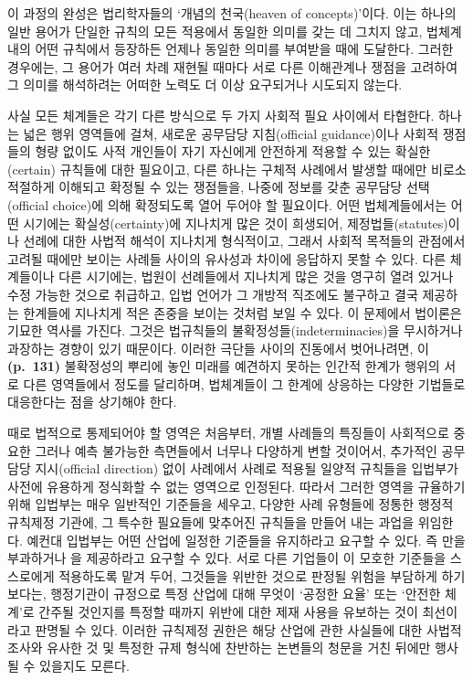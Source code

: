 이 과정의 완성은 법리학자들의 ‘개념의 천국(heaven of concepts)’이다.
이는 하나의 일반 용어가 단일한 규칙의 모든 적용에서 동일한 의미를 갖는
데 그치지 않고, 법체계 내의 어떤 규칙에서 등장하든 언제나 동일한 의미를
부여받을 때에 도달한다. 그러한 경우에는, 그 용어가 여러 차례 재현될
때마다 서로 다른 이해관계나 쟁점을 고려하여 그 의미를 해석하려는 어떠한
노력도 더 이상 요구되거나 시도되지 않는다.

사실 모든 체계들은 각기 다른 방식으로 두 가지 사회적 필요 사이에서
타협한다. 하나는 넓은 행위 영역들에 걸쳐, 새로운 공무담당 지침(official
guidance)이나 사회적 쟁점들의 형량 없이도 사적 개인들이 자기 자신에게
안전하게 적용할 수 있는 확실한(certain) 규칙들에 대한 필요이고, 다른
하나는 구체적 사례에서 발생할 때에만 비로소 적절하게 이해되고 확정될 수
있는 쟁점들을, 나중에 정보를 갖춘 공무담당 선택(official choice)에 의해
확정되도록 열어 두어야 할 필요이다. 어떤 법체계들에서는 어떤 시기에는
확실성(certainty)에 지나치게 많은 것이 희생되어, 제정법들(statutes)이나
선례에 대한 사법적 해석이 지나치게 형식적이고, 그래서 사회적 목적들의
관점에서 고려될 때에만 보이는 사례들 사이의 유사성과 차이에 응답하지
못할 수 있다. 다른 체계들이나 다른 시기에는, 법원이 선례들에서 지나치게
많은 것을 영구히 열려 있거나 수정 가능한 것으로 취급하고, 입법 언어가 그
개방적 직조에도 불구하고 결국 제공하는 한계들에 지나치게 적은 존중을
보이는 것처럼 보일 수 있다. 이 문제에서 법이론은 기묘한 역사를 가진다.
그것은 법규칙들의 불확정성들(indeterminacies)을 무시하거나 과장하는
경향이 있기 때문이다. 이러한 극단들 사이의 진동에서 벗어나려면, 이
\textbf{(p.~131)} 불확정성의 뿌리에 놓인 미래를 예견하지 못하는 인간적
한계가 행위의 서로 다른 영역들에서 정도를 달리하며, 법체계들이 그 한계에
상응하는 다양한 기법들로 대응한다는 점을 상기해야 한다.

때로 법적으로 통제되어야 할 영역은 처음부터, 개별 사례들의 특징들이
사회적으로 중요한 그러나 예측 불가능한 측면들에서 너무나 다양하게 변할
것이어서, 추가적인 공무담당 지시(official direction) 없이 사례에서
사례로 적용될 일양적 규칙들을 입법부가 사전에 유용하게 정식화할 수 없는
영역으로 인정된다. 따라서 그러한 영역을 규율하기 위해 입법부는 매우
일반적인 기준들을 세우고, 다양한 사례 유형들에 정통한 행정적 규칙제정
기관에, 그 특수한 필요들에 맞추어진 규칙들을 만들어 내는 과업을
위임한다. 예컨대 입법부는 어떤 산업에 일정한 기준들을 유지하라고 요구할
수 있다. 즉 만을 부과하거나 을 제공하라고 요구할 수 있다. 서로 다른
기업들이 이 모호한 기준들을 스스로에게 적용하도록 맡겨 두어,
 그것들을 위반한 것으로 판정될 위험을
부담하게 하기보다는, 행정기관이 규정으로 특정 산업에 대해 무엇이 ‘공정한
요율’ 또는 ‘안전한 체계’로 간주될 것인지를 특정할 때까지 위반에 대한
제재 사용을 유보하는 것이 최선이라고 판명될 수 있다. 이러한 규칙제정
권한은 해당 산업에 관한 사실들에 대한 사법적 조사와 유사한 것 및 특정한
규제 형식에 찬반하는 논변들의 청문을 거친 뒤에만 행사될 수 있을지도
모른다.

